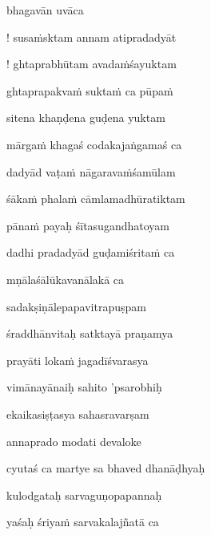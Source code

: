 bhagavān uvāca~{\dandab}\dontdisplaylinenum 

\nemsloka 
! susaṁsktam annam atipradadyāt
\dontdisplaylinenum

\nemslokab 
! ghtaprabhūtam avadaṁśayuktam \danda\dontdisplaylinenum

\nemslokac 
ghtaprapakvaṁ suktaṁ ca pūpaṁ
\dontdisplaylinenum

\nemslokad 
sitena khaṇḍena guḍena yuktam \veg\dontdisplaylinenum
{}

\ujvers\nemsloka 
mārgaṁ khagaś codakajaṅgamaś ca
\dontdisplaylinenum

\nemslokab 
dadyād vaṭaṁ nāgaravaṁśamūlam \danda\dontdisplaylinenum

\nemslokac 
śākaṁ phalaṁ cāmlamadhūratiktam
\dontdisplaylinenum

\nemslokad 
pānaṁ payaḥ śītasugandhatoyam \veg\dontdisplaylinenum
{}

\ujvers\nemsloka 
dadhi pradadyād guḍamiśritaṁ ca
\dontdisplaylinenum

\nemslokab 
mṇālaśālūkavanālakā ca \danda\dontdisplaylinenum

\nemslokac 
sadakṣiṇālepapavitrapuṣpam
\dontdisplaylinenum

\nemslokad 
śraddhānvitaḥ satktayā praṇamya \veg\dontdisplaylinenum
{}

\ujvers\nemsloka 
prayāti lokaṁ jagadīśvarasya
\dontdisplaylinenum

\nemslokab 
vimānayānaiḥ sahito 'psarobhiḥ \danda\dontdisplaylinenum

\nemslokac 
ekaikasiṣṭasya sahasravarṣam
\dontdisplaylinenum

\nemslokad 
annaprado modati devaloke \veg\dontdisplaylinenum

\ujvers\nemsloka 
cyutaś ca martye sa bhaved dhanāḍhyaḥ
\dontdisplaylinenum

\nemslokab 
kulodgataḥ sarvaguṇopapannaḥ \danda\dontdisplaylinenum

\nemslokac 
yaśaḥ śriyaṁ sarvakalajñatā ca
\dontdisplaylinenum

